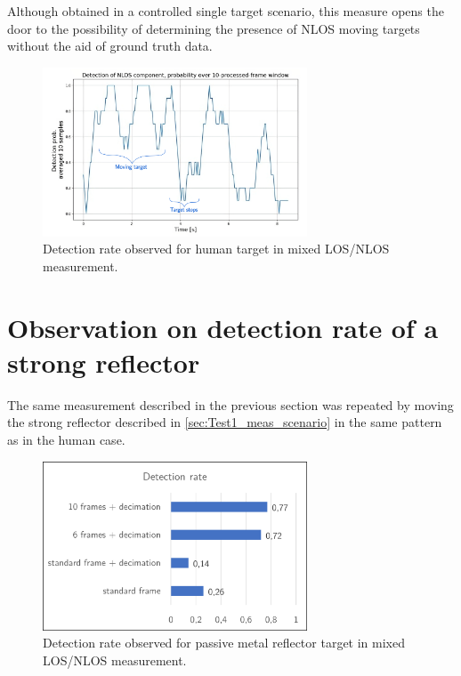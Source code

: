 Although obtained in a controlled single target scenario, this measure opens the door to the possibility of determining the presence of NLOS moving targets without the aid of ground truth data.


\begin{figure}[H]
	\centering
	\includegraphics[width=0.7\textwidth]{Images/Test1/moving_avg-transformed_wtext}
	\caption{Detection rate observed for human target in mixed LOS/NLOS measurement.}
	\label{fig:Test1_moving_avg}
\end{figure}

\section{Observation on detection rate of a strong reflector}

The same measurement described in the previous section was repeated by moving the strong reflector described in \ref{sec:Test1_meas_scenario} in the same pattern as in the human case.

\begin{figure}[H]
	\centering
	\includegraphics[width=0.7\textwidth]{Images/Test1/detect_hist_strong_ref.png}
	\caption{Detection rate observed for passive metal reflector target in mixed LOS/NLOS measurement.}
	\label{fig:Test1_detect_rate_strong_ref}
\end{figure}

